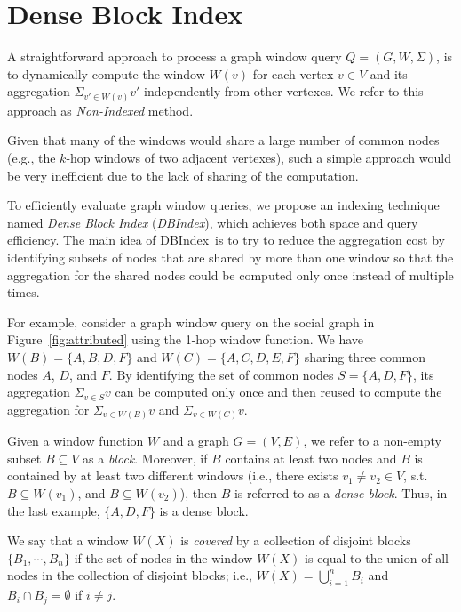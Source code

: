 \newcommand{\DBIndex}{DBIndex}
\newcommand{\blockset}{{\cal B}}
\newcommand{\clusterset}{{\cal C}}
\section{Dense Block Index}
A straightforward approach to process a graph window query 
$Q = (G, W, \Sigma)$, %
is to dynamically compute the window $W(v)$ for each vertex $v \in V$ and
its aggregation 
$\Sigma_{v' \in W(v)} v'$ 
independently from other vertexes. We refer to this approach as \emph{Non-Indexed} method.

Given that many of the windows would share a large number of common nodes (e.g., the $k$-hop windows of two adjacent 
vertexes),
such a simple approach would be very inefficient due to the lack of sharing of the computation. 

To efficiently evaluate graph window queries, we propose an indexing technique named \emph{Dense Block Index} (\textit{\DBIndex}), which achieves both space and query efficiency. 
The main idea of \DBIndex\ is to try to reduce the aggregation cost by identifying subsets of nodes that are shared by more than one window 
so that the aggregation for the shared nodes could be computed only once instead of multiple times.

For example, consider a graph window query on the social graph in Figure~\ref{fig:attributed} 
using the 1-hop window function.
We have $W(B) = \{A,B,D,F\}$ and $W(C) = \{A,C,D,E,F\}$ sharing three common nodes $A$, $D$, and $F$.
By identifying the set of common nodes $S=\{A,D,F\}$, its aggregation 
$\Sigma_{v \in S} v$ can be computed only once
and then reused to compute the aggregation for $\Sigma_{v \in W(B)} v$ and $\Sigma_{v \in W(C)} v$.

Given a window function $W$ and a graph $G=(V,E)$,
we refer to a non-empty subset $B \subseteq V$ as a {\it block}.
Moreover, if $B$ contains at least two nodes and $B$ is contained by at least two different windows
(i.e., there exists $v_1 \neq v_2 \in V$, s.t. $B \subseteq W(v_1)$, and $B \subseteq W(v_2)$),
then $B$ is referred to as a {\it dense block}.
Thus, in the last example, $\{A,D,F\}$ is a dense block.

We say that a window $W(X)$ is {\it covered} by a collection of disjoint blocks $\{B_1,\cdots,B_n\}$
if the set of nodes in the window $W(X)$ is equal to the union of all nodes in the collection of disjoint blocks;
i.e., $W(X) = \bigcup_{i=1}^{n} B_i$ and $B_i \cap B_j = \emptyset$ if $i \neq j$.

